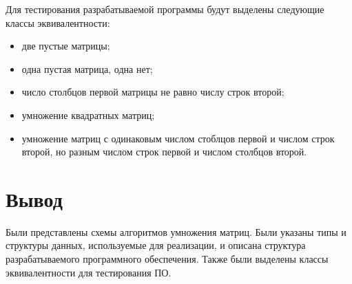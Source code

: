 Для тестирования разрабатываемой программы будут выделены следующие классы эквивалентности:

\begin{itemize}
	\item две пустые матрицы;
	\item одна пустая матрица, одна нет;
	\item число столбцов первой матрицы не равно числу строк второй;
	\item умножение квадратных матриц;
	\item умножение матриц с одинаковым числом стоблцов первой и числом строк второй, но разным числом строк первой и числом столбцов второй.
\end{itemize}

\section{Вывод}

Были представлены схемы алгоритмов умножения матриц. Были указаны типы и структуры данных, используемые для реализации, и описана структура разрабатываемого программного обеспечения. Также были выделены классы эквивалентности для тестирования ПО.
